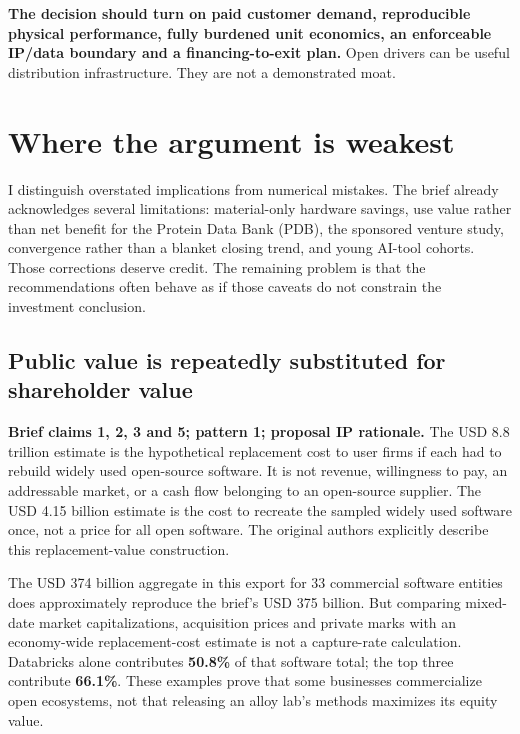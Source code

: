 \documentclass{article}
\begin{document}
\textbf{The decision should turn on paid customer demand, reproducible
physical performance, fully burdened unit economics, an enforceable
IP/data boundary and a financing-to-exit plan.} Open drivers can be
useful distribution infrastructure. They are not a demonstrated moat.


\clearpage
\tableofcontents

\clearpage
\providecommand{\tightlist}{\setlength{\itemsep}{0pt}\setlength{\parskip}{0pt}}
\providecommand{\passthrough}[1]{#1}
\section{Where the argument is
weakest}\label{where-the-argument-is-weakest}

I distinguish overstated implications from numerical mistakes. The brief
already acknowledges several limitations: material-only hardware
savings, use value rather than net benefit for the Protein Data Bank
(PDB), the sponsored venture study, convergence rather than a blanket
closing trend, and young AI-tool cohorts. Those corrections deserve
credit. The remaining problem is that the recommendations often behave
as if those caveats do not constrain the investment conclusion.
\citep{InputBrief,InputRecommendations}

\subsection{Public value is repeatedly substituted for shareholder
value}\label{public-value-is-repeatedly-substituted-for-shareholder-value}

\textbf{Brief claims 1, 2, 3 and 5; pattern 1; proposal IP rationale.}
The USD 8.8 trillion estimate is the hypothetical replacement cost to
user firms if each had to rebuild widely used open-source software. It
is not revenue, willingness to pay, an addressable market, or a cash
flow belonging to an open-source supplier. The USD 4.15 billion estimate
is the cost to recreate the sampled widely used software once, not a
price for all open software. The original authors explicitly describe
this replacement-value construction. \citep{Hoffmann2024Value}

The USD 374 billion aggregate in this export for 33 commercial software
entities does approximately reproduce the brief's USD 375 billion. But
comparing mixed-date market capitalizations, acquisition prices and
private marks with an economy-wide replacement-cost estimate is not a
capture-rate calculation. Databricks alone contributes \textbf{50.8\%}
of that software total; the top three contribute \textbf{66.1\%}. These
examples prove that some businesses commercialize open ecosystems, not
that releasing an alloy lab's methods maximizes its equity value.
\citep{InputData}
\end{document}
